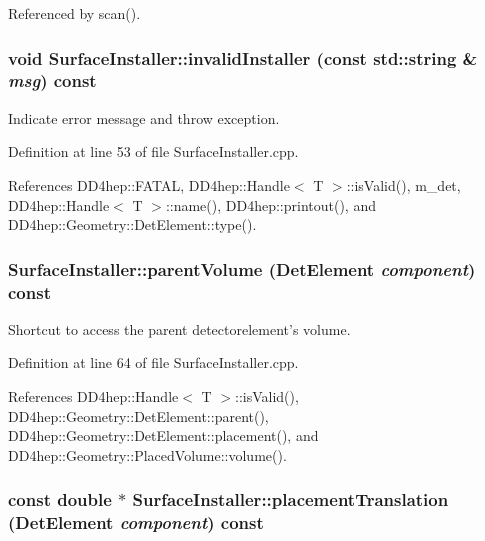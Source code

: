 Referenced by scan().\hypertarget{class_d_d4hep_1_1_surface_installer_a28890bdc758b65cf6224680631988d06}{
\subsubsection[{invalidInstaller}]{\setlength{\rightskip}{0pt plus 5cm}void SurfaceInstaller::invalidInstaller (const std::string \& {\em msg}) const}}
\label{class_d_d4hep_1_1_surface_installer_a28890bdc758b65cf6224680631988d06}


Indicate error message and throw exception. 

Definition at line 53 of file SurfaceInstaller.cpp.

References DD4hep::FATAL, DD4hep::Handle$<$ T $>$::isValid(), m\_\-det, DD4hep::Handle$<$ T $>$::name(), DD4hep::printout(), and DD4hep::Geometry::DetElement::type().\hypertarget{class_d_d4hep_1_1_surface_installer_a18aa921877964baf2b272bd0e80d4b8e}{
\subsubsection[{parentVolume}]{ SurfaceInstaller::parentVolume ({\bf DetElement} {\em component}) const}}
\label{class_d_d4hep_1_1_surface_installer_a18aa921877964baf2b272bd0e80d4b8e}


Shortcut to access the parent detectorelement's volume. 

Definition at line 64 of file SurfaceInstaller.cpp.

References DD4hep::Handle$<$ T $>$::isValid(), DD4hep::Geometry::DetElement::parent(), DD4hep::Geometry::DetElement::placement(), and DD4hep::Geometry::PlacedVolume::volume().\hypertarget{class_d_d4hep_1_1_surface_installer_a169f1f28ec4bc4d6006dd49bb5eb6d39}{
\subsubsection[{placementTranslation}]{\setlength{\rightskip}{0pt plus 5cm}const double $\ast$ SurfaceInstaller::placementTranslation ({\bf DetElement} {\em component}) const}}
\label{class_d_d4hep_1_1_surface_installer_a169f1f28ec4bc4d6006dd49bb5eb6d39}


